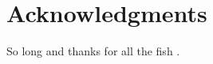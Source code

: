 \documentclass[fleqn,10pt]{SelfArx} %
\begin{document}










\section*{Acknowledgments} %


So long and thanks for all the fish \cite{conv2dxls,mlxspec}.





\end{document}

